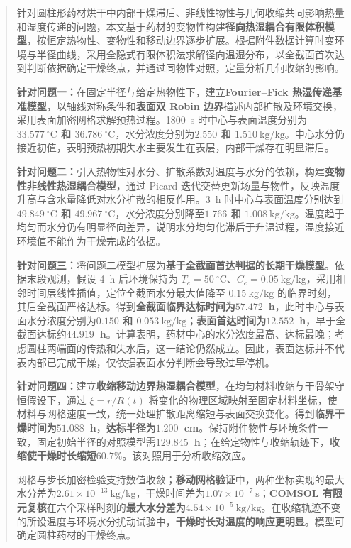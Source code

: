 \begin{abstract}
针对圆柱形药材烘干中内部干燥滞后、非线性物性与几何收缩共同影响热量和湿度传递的问题，本文基于药材的变物性构建\textbf{径向热湿耦合有限体积模型}，按恒定热物性、变物性和移动边界逐步扩展。根据附件数据计算时变环境与半径曲线，采用全隐式有限体积法求解径向温湿分布，以全截面首次达到判断依据确定干燥终点，并通过同物性对照，定量分析几何收缩的影响。

\textbf{针对问题一：}在固定半径与给定热物性下，建立\textbf{Fourier--Fick 热湿传递基准模型}，以轴线对称条件和\textbf{表面双 Robin 边界}描述内部扩散及环境交换，采用表面加密网格求解预热过程。1800~s 时中心与表面温度分别为{\bfseries\boldmath $33.577~{}^\circ\mathrm C$ 和 $36.786~{}^\circ\mathrm C$}，水分浓度分别为{\bfseries\boldmath $2.550$ 和 $1.510~\mathrm{kg/kg}$}。中心水分仍接近初值，表明预热初期失水主要发生在表层，内部干燥存在明显滞后。

\textbf{针对问题二：}引入热物性对水分、扩散系数对温度与水分的依赖，构建\textbf{变物性非线性热湿耦合模型}，通过 Picard 迭代交替更新场量与物性，反映温度升高与含水量降低对水分扩散的相反作用。3~h 时中心与表面温度分别达到{\bfseries\boldmath $49.849~{}^\circ\mathrm C$ 和 $49.967~{}^\circ\mathrm C$}，水分浓度分别降至{\bfseries\boldmath $1.766$ 和 $1.008~\mathrm{kg/kg}$}。温度趋于均匀而水分仍有明显径向差异，说明水分均匀化滞后于升温过程，温度接近环境值不能作为干燥完成的依据。

\textbf{针对问题三：}将问题二模型扩展为\textbf{基于全截面首达判据的长期干燥模型}。依据末段观测，假设 4~h 后环境保持为 $T_e=50~{}^\circ\mathrm C$、$C_e=0.05~\mathrm{kg/kg}$，采用相邻时间层线性插值，定位全截面水分最大值降至 $0.15~\mathrm{kg/kg}$ 的临界时刻，其后全截面严格达标。得到\textbf{全截面临界达标时间为}{\bfseries\boldmath $57.472$~h}，此时中心与表面水分浓度分别为{\bfseries\boldmath $0.150$ 和 $0.053~\mathrm{kg/kg}$}；\textbf{表面首达时间为}{\bfseries\boldmath $12.552$~h}，早于全截面达标约{\bfseries\boldmath $44.919$~h}。计算表明，药材中心的水分浓度最高、达标最晚；考虑圆柱两端面的传热和失水后，这一结论仍然成立。因此，表面达标并不代表内部已完成干燥，仅依据表面水分判断会导致过早停机。

\textbf{针对问题四：}建立\textbf{收缩移动边界热湿耦合模型}，在均匀材料收缩与干骨架守恒假设下，通过 $\xi=r/R(t)$ 将变化的物理区域映射至固定材料坐标，使材料与网格速度一致，统一处理扩散距离缩短与表面交换变化。得到\textbf{临界干燥时间为}{\bfseries\boldmath $51.088$~h}，\textbf{达标半径为}{\bfseries\boldmath $1.200$~cm}。保持附件物性与环境条件一致，固定初始半径的对照模型需{\bfseries\boldmath $129.845$~h}；在给定物性与收缩轨迹下，\textbf{收缩使干燥时长缩短}{\bfseries\boldmath $60.7\%$}。该对照用于分析收缩效应。

网格与步长加密检验支持数值收敛；\textbf{移动网格验证}中，两种坐标实现的最大水分差为\mbox{\bfseries\boldmath $2.61\times10^{-13}~\mathrm{kg/kg}$}，干燥时间差为\mbox{\bfseries\boldmath $1.07\times10^{-7}~\mathrm{s}$}；\textbf{COMSOL 有限元复核}在六个采样时刻的\textbf{最大水分差为}\mbox{\bfseries\boldmath $4.54\times10^{-5}~\mathrm{kg/kg}$}。在收缩轨迹不变的所设温度与环境水分扰动试验中，\textbf{干燥时长对温度的响应更明显}。模型可确定圆柱药材的干燥终点。

\end{abstract}
